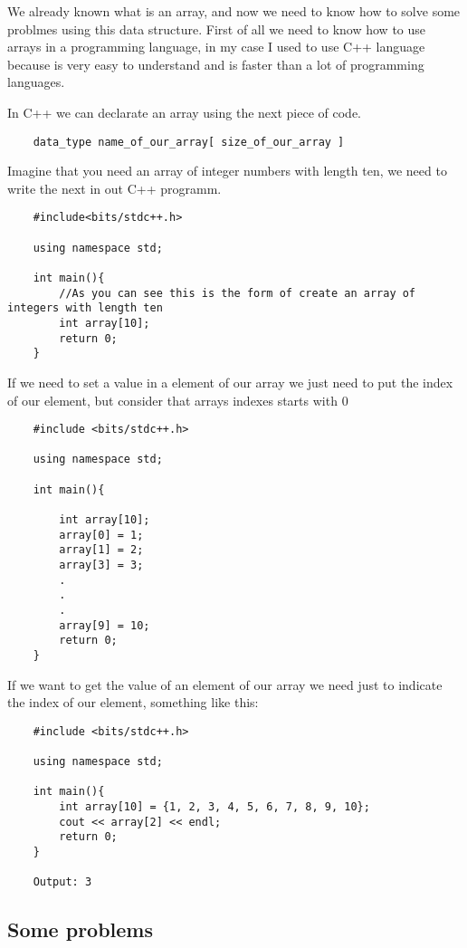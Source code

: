 We already known what is an array, and now we need to know how to solve some problmes using this data structure. First of all we need to know how to use arrays in a programming language, in my case I used to use C++ language because is very easy to understand and is faster than a lot of programming languages.

In C++ we can declarate an array using the next piece of code.
\begin{lstlisting}
    data_type name_of_our_array[ size_of_our_array ]
\end{lstlisting}

Imagine that you need an array of integer numbers with length ten, we need to write the next in out C++ programm.

\begin{lstlisting}
    #include<bits/stdc++.h>
    
    using namespace std;

    int main(){
        //As you can see this is the form of create an array of integers with length ten
        int array[10];
        return 0;
    }
\end{lstlisting}

If we need to set a value in a element of our array we just need to put the index of our element, but consider that arrays indexes starts with 0

\begin{lstlisting}
    #include <bits/stdc++.h>
    
    using namespace std;

    int main(){
        
        int array[10];
        array[0] = 1;
        array[1] = 2;
        array[3] = 3;
        .
        .
        .
        array[9] = 10;
        return 0;
    }

\end{lstlisting}

If we want to get the value of an element of our array we need just to indicate the index of our element, something like this:
\begin{lstlisting}
    #include <bits/stdc++.h>

    using namespace std;

    int main(){
        int array[10] = {1, 2, 3, 4, 5, 6, 7, 8, 9, 10};
        cout << array[2] << endl;
        return 0;
    }

    Output: 3
\end{lstlisting}

\subsection{Some problems}
